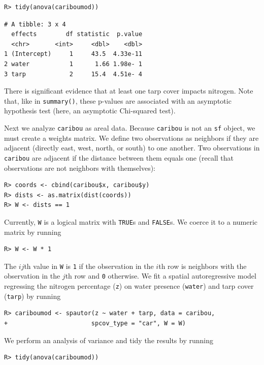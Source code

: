 \documentclass{article}
\begin{document}
\begin{verbatim}
R> tidy(anova(cariboumod))
\end{verbatim}

\begin{verbatim}
# A tibble: 3 x 4
  effects        df statistic  p.value
  <chr>       <int>     <dbl>    <dbl>
1 (Intercept)     1     43.5  4.33e-11
2 water           1      1.66 1.98e- 1
3 tarp            2     15.4  4.51e- 4
\end{verbatim}

There is significant evidence that at least one tarp cover impacts
nitrogen. Note that, like in \texttt{summary()}, these p-values are
associated with an asymptotic hypothesis test (here, an asymptotic
Chi-squared test).

Next we analyze \texttt{caribou} as areal data. Because \texttt{caribou}
is not an \texttt{sf} object, we must create a weights matrix. We define
two observations as neighbors if they are adjacent (directly east, west,
north, or south) to one another. Two observations in \texttt{caribou}
are adjacent if the distance between them equals one (recall that
observations are not neighbors with themselves):

\begin{verbatim}
R> coords <- cbind(caribou$x, caribou$y)
R> dists <- as.matrix(dist(coords))
R> W <- dists == 1
\end{verbatim}

Currently, \texttt{W} is a logical matrix with \texttt{TRUE}s and
\texttt{FALSE}s. We coerce it to a numeric matrix by running

\begin{verbatim}
R> W <- W * 1
\end{verbatim}

The \(ij\)th value in \texttt{W} is \texttt{1} if the observation in the
\(i\)th row is neighbors with the observation in the \(j\)th row and
\texttt{0} otherwise. We fit a spatial autoregressive model regressing
the nitrogen percentage (\texttt{z}) on water presence (\texttt{water})
and tarp cover (\texttt{tarp}) by running

\begin{verbatim}
R> cariboumod <- spautor(z ~ water + tarp, data = caribou,
+                       spcov_type = "car", W = W)
\end{verbatim}

We perform an analysis of variance and tidy the results by running

\begin{verbatim}
R> tidy(anova(cariboumod))
\end{verbatim}
\end{document}
